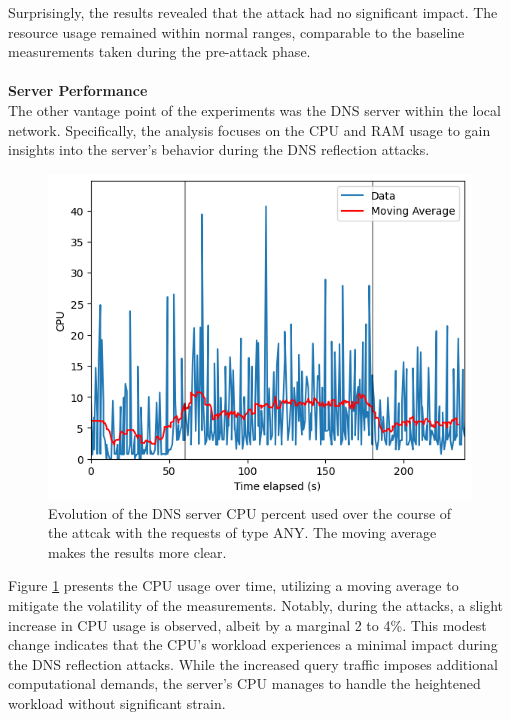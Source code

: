 Surprisingly, the results revealed that the attack had no significant impact. The resource usage remained within normal ranges, comparable to the baseline measurements taken during the pre-attack phase.\\
\\
\noindent \textbf{Server Performance}\\
The other vantage point of the experiments was the DNS server within the local network. Specifically, the analysis focuses on the CPU and RAM usage to gain insights into the server's behavior during the DNS reflection attacks.
\begin{figure}[H]
    \centering
    \includegraphics[width=\columnwidth]{Sections/Images/Server_CPU_ANY10.png}
    \caption{Evolution of the DNS server CPU percent used over the course of the attcak with the requests of type ANY. The moving average makes the results more clear.}
    \label{fig:Server_CPU1}
\end{figure}
\noindent Figure \ref{fig:Server_CPU1} presents the CPU usage over time, utilizing a moving average to mitigate the volatility of the measurements. Notably, during the attacks, a slight increase in CPU usage is observed, albeit by a marginal 2 to 4\%. This modest change indicates that the CPU's workload experiences a minimal impact during the DNS reflection attacks. While the increased query traffic imposes additional computational demands, the server's CPU manages to handle the heightened workload without significant strain. \\
